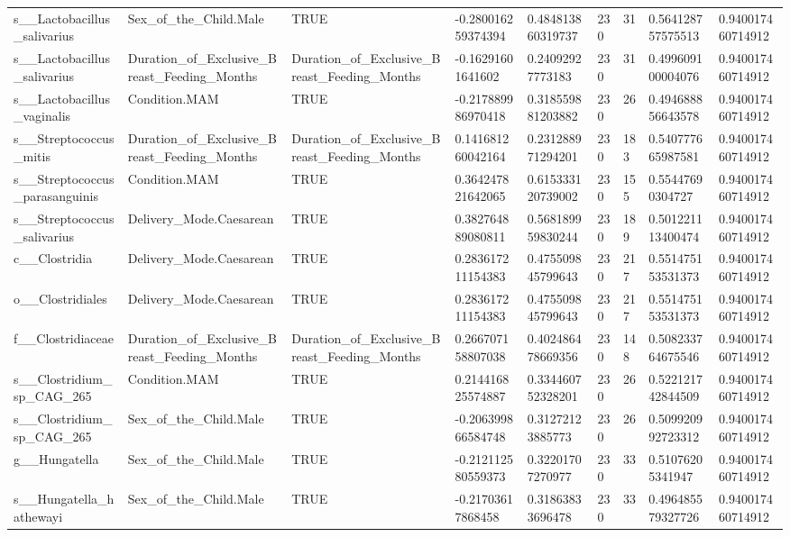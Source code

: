 \begin{longtable}{lllllllll}
s\_\_Lactobacillus\_salivarius & Sex\_of\_the\_Child.Male & TRUE & -0.280016259374394 & 0.484813860319737 & 230 & 31 & 0.564128757575513 & 0.940017460714912 \\
s\_\_Lactobacillus\_salivarius & Duration\_of\_Exclusive\_Breast\_Feeding\_Months & Duration\_of\_Exclusive\_Breast\_Feeding\_Months & -0.16291601641602 & 0.24092927773183 & 230 & 31 & 0.499609100004076 & 0.940017460714912 \\
s\_\_Lactobacillus\_vaginalis & Condition.MAM & TRUE & -0.217889986970418 & 0.318559881203882 & 230 & 26 & 0.494688856643578 & 0.940017460714912 \\
s\_\_Streptococcus\_mitis & Duration\_of\_Exclusive\_Breast\_Feeding\_Months & Duration\_of\_Exclusive\_Breast\_Feeding\_Months & 0.141681260042164 & 0.231288971294201 & 230 & 183 & 0.540777665987581 & 0.940017460714912 \\
s\_\_Streptococcus\_parasanguinis & Condition.MAM & TRUE & 0.364247821642065 & 0.615333120739002 & 230 & 155 & 0.55447690304727 & 0.940017460714912 \\
s\_\_Streptococcus\_salivarius & Delivery\_Mode.Caesarean & TRUE & 0.382764889080811 & 0.568189959830244 & 230 & 189 & 0.501221113400474 & 0.940017460714912 \\
c\_\_Clostridia & Delivery\_Mode.Caesarean & TRUE & 0.283617211154383 & 0.475509845799643 & 230 & 217 & 0.551475153531373 & 0.940017460714912 \\
o\_\_Clostridiales & Delivery\_Mode.Caesarean & TRUE & 0.283617211154383 & 0.475509845799643 & 230 & 217 & 0.551475153531373 & 0.940017460714912 \\
f\_\_Clostridiaceae & Duration\_of\_Exclusive\_Breast\_Feeding\_Months & Duration\_of\_Exclusive\_Breast\_Feeding\_Months & 0.266707158807038 & 0.402486478669356 & 230 & 148 & 0.508233764675546 & 0.940017460714912 \\
s\_\_Clostridium\_sp\_CAG\_265 & Condition.MAM & TRUE & 0.214416825574887 & 0.334460752328201 & 230 & 26 & 0.522121742844509 & 0.940017460714912 \\
s\_\_Clostridium\_sp\_CAG\_265 & Sex\_of\_the\_Child.Male & TRUE & -0.206399866584748 & 0.31272123885773 & 230 & 26 & 0.509920992723312 & 0.940017460714912 \\
g\_\_Hungatella & Sex\_of\_the\_Child.Male & TRUE & -0.212112580559373 & 0.32201707270977 & 230 & 33 & 0.51076205341947 & 0.940017460714912 \\
s\_\_Hungatella\_hathewayi & Sex\_of\_the\_Child.Male & TRUE & -0.21703617868458 & 0.31863833696478 & 230 & 33 & 0.496485579327726 & 0.940017460714912 \\

\end{longtable}
